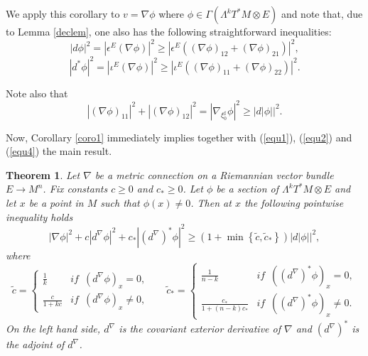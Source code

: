 \documentclass[12pt]{amsart} %
\newtheorem{theorem}{Theorem}[section]
\theoremstyle{definition}
\numberwithin{equation}{section}
\newcommand{\ra}{\rightarrow}
\begin{document}
We apply this corollary to $v=\nabla \phi$ where $\phi\in\Gamma(\Lambda^kT^ *M\otimes E)$ and note that, due to Lemma \ref{declem}, one also has the following straightforward inequalities:
\begin{equation}\label{equ1} |d\phi|^2=|\epsilon^E(\nabla\phi)|^2\geq  |\epsilon^E((\nabla \phi)_{12}+(\nabla \phi)_{21})|^2,
\end{equation}
\begin{equation}\label{equ2}|d^ *\phi|^2=|\iota^E(\nabla\phi)|^2\geq  |\iota^E((\nabla \phi)_{11}+(\nabla \phi)_{22})|^2.
\end{equation}

Note also that
 \begin{equation}\label{equ4}|(\nabla \phi)_{11}|^2+|(\nabla \phi)_{12}|^2=|\nabla_{\xi_0^{\sharp}}\phi|^2\geq |d|\phi||^ 2.
\end{equation}

Now, Corollary \ref{coro1}  immediately implies together with (\ref{equ1}), (\ref{equ2}) and (\ref{equ4}) the main result.

\begin{theorem} Let $\nabla$ be a metric connection on a Riemannian vector bundle $E \ra M^n$. Fix constants $c\geq 0$ and $c_{*}\geq 0$. Let $\phi$ be a section of $\Lambda^{k}T^{*}M\otimes E$ and let $x$ be a point in $M$ such that $\phi(x)\neq0$. Then at $x$ the following pointwise inequality holds
\[
|\nabla\phi|^{2}+c|d^\nabla \phi|^{2}+c_{*}|(d^{\nabla})^*\phi|^{2}\geq\left(1+\min\left\{ \tilde{c},\tilde{c}_{*}\right\} \right)|d|\phi||^{2},
\]
where
\[
\tilde{c}=\begin{cases}
\frac{1}{k} & if\,\,\,\left(d^\nabla \phi\right)_{x}=0,\\
\frac{c}{1+kc} & if\,\,\,\left(d^\nabla \phi\right)_{x}\neq0,
\end{cases}\,\,\,\,\,\,\,\,\,\,\tilde{c}_{*}=\begin{cases}
\frac{1}{n-k} & if\,\,\,\left((d^\nabla)^{*}\phi\right)_{x}=0,\\
\frac{c_{*}}{1+\left(n-k\right)c_{*}} & if\,\,\,\left((d^\nabla)^{*}\phi\right)_{x}\neq0.
\end{cases}
\]
On the left hand side, $d^\nabla$ is the covariant exterior derivative of
$\nabla$ and $(d^\nabla)^*$ is the adjoint of $d^\nabla$.
\end{theorem}
\end{document}
